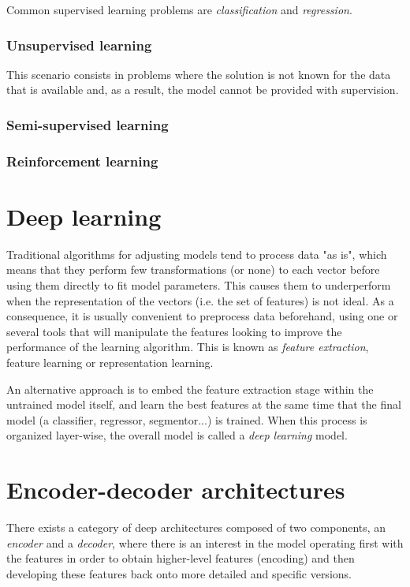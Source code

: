 Common supervised learning problems are \textit{classification} and \textit{regression}.

\subsubsection{Unsupervised learning}

This scenario consists in problems where the solution is not known for the data that is available and, as a result, the model cannot be provided with supervision. 

\subsubsection{Semi-supervised learning}

\subsubsection{Reinforcement learning}


\section{Deep learning}

Traditional algorithms for adjusting models tend to process data "as is", which means that they perform few transformations (or none) to each vector before using them directly to fit model parameters. This causes them to underperform when the representation of the vectors (i.e. the set of features) is not ideal. As a consequence, it is usually convenient to preprocess data beforehand, using one or several tools that will manipulate the features looking to improve the performance of the learning algorithm. This is known as \textit{feature extraction}, feature learning or representation learning. 

An alternative approach is to embed the feature extraction stage within the untrained model itself, and learn the best features at the same time that the final model (a classifier, regressor, segmentor...) is trained. When this process is organized layer-wise, the overall model is called a \textit{deep learning} model.

\section{Encoder-decoder architectures}

There exists a category of deep architectures composed of two components, an \textit{encoder} and a \textit{decoder}, where there is an interest in the model operating first with the features in order to obtain higher-level features (encoding) and then developing these features back onto more detailed and specific versions.

